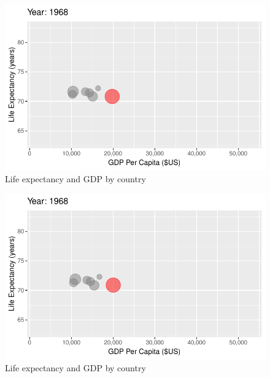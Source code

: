 \documentclass[
  letterpaper,
  DIV=11,
  numbers=noendperiod]{scrreport}
\theoremstyle{definition}
\theoremstyle{remark}
\begin{document}
\begin{figure}

{\centering \includegraphics{index_files/figure-pdf/fig-anim-country-29.pdf}

}

\caption{\label{fig-anim-country-29}Life expectancy and GDP by country}

\end{figure}

\begin{figure}

{\centering \includegraphics{index_files/figure-pdf/fig-anim-country-30.pdf}

}

\caption{\label{fig-anim-country-30}Life expectancy and GDP by country}

\end{figure}
\end{document}
